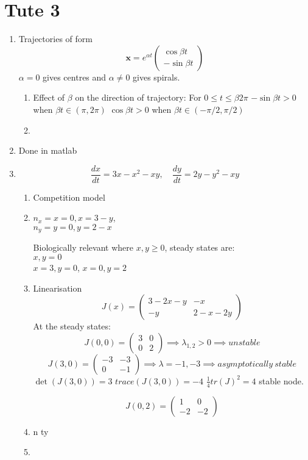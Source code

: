 \documentclass{X:/Documents/Coding/Latex/myassignment}
\begin{document}
\section{Tute 3}
\begin{enumerate}
    \item Trajectories of form
    \[\mathbf{x} = e^{\alpha t}\begin{pmatrix}
        \cos \beta t\\ -\sin \beta t

    \end{pmatrix}\]
    $\alpha= 0$ gives centres and $\alpha\neq 0$ gives spirals. 
    \begin{enumerate}
        \item Effect of $\beta$ on the direction of trajectory: For $0\leq t \leq \beta 2\pi $
        $-\sin \beta t > 0$ when $\beta t \in (\pi, 2 \pi)$
        $\cos \beta t > 0$ when $\beta t \in (-\pi/2,\pi/2)$
        \item 
    \end{enumerate}
    \item Done in matlab
    \item 
    \[\frac{dx}{dt} = 3x - x^2 - xy, \quad \frac{dy}{dt} = 2y - y^2 - xy\]
    \begin{enumerate}
        \item Competition model
        \item $n_x = x=0, x = 3-y$, \\
        $n_y = y = 0, y = 2-x$

        Biologically relevant where $x,y \geq 0 $, steady states are:\\
        $x,y=0$\\
        $x = 3, y = 0$,
        $x = 0, y = 2$
        \item Linearisation
        \[J(x) = \begin{pmatrix}
            3 - 2x -y & -x\\ -y & 2-x - 2y
        \end{pmatrix}\]
At the steady states: 
\[J(0,0) = \begin{pmatrix}
    3&0\\0&2
\end{pmatrix} \implies \lambda_{1,2} > 0\implies unstable\]
\[J(3,0) = \begin{pmatrix}
    -3&-3\\ 0 & -1
\end{pmatrix} \implies \lambda = -1,-3 \implies  asymptotically\ stable\]
$\det(J(3,0)) = 3$ $trace(J(3,0)) = -4$
$\frac14 tr(J)^2 = 4$ stable node.



\[J(0,2) = \begin{pmatrix}
    1&0\\-2&-2
\end{pmatrix}\]



        \item n ty
        \item 
    \end{enumerate}


\end{enumerate}
\end{document}
